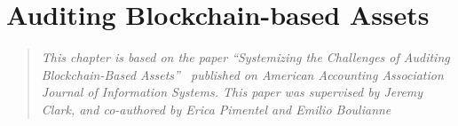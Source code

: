 \chapter{Auditing Blockchain-based Assets} \label{sec:auditing}


\begin{quote}
	\textit{This chapter is based on the paper ``Systemizing the Challenges of Auditing Blockchain-Based Assets''~\cite{pimentel2021systemizing} published on American Accounting Association Journal of Information Systems. This paper was supervised by Jeremy Clark, and co-authored by Erica Pimentel and Emilio Boulianne}

\end{quote}

